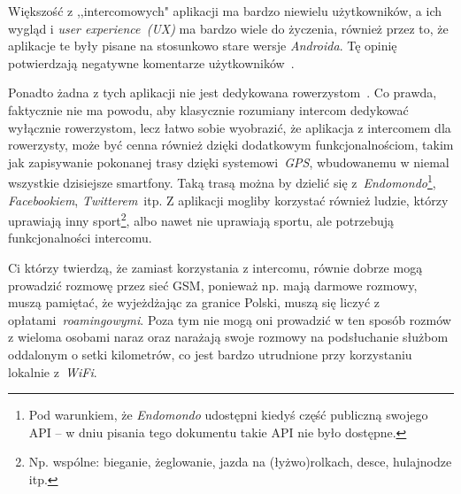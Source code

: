 \documentclass{article}
\begin{document}
Większość z ,,intercomowych" aplikacji ma bardzo niewielu użytkowników, a ich wygląd i \emph{user experience~(UX)} ma bardzo wiele do życzenia, również przez to, że aplikacje te były pisane na stosunkowo stare wersje \emph{Androida}. Tę opinię potwierdzają negatywne komentarze użytkowników~\cite{www:existing-android-intercoms}.

Ponadto żadna z tych aplikacji nie jest dedykowana rowerzystom~\cite{www:best-existing-android-intercom}. Co prawda, faktycznie nie ma powodu, aby klasycznie rozumiany intercom dedykować wyłącznie rowerzystom, lecz łatwo sobie wyobrazić, że aplikacja z intercomem dla rowerzysty, może być cenna również dzięki dodatkowym funkcjonalnościom, takim jak zapisywanie pokonanej trasy dzięki systemowi~\emph{GPS}, wbudowanemu w niemal wszystkie dzisiejsze smartfony. Taką trasą można by dzielić się z~\emph{Endomondo}\footnote{Pod warunkiem, że \emph{Endomondo} udostępni kiedyś część publiczną swojego API -- w dniu pisania tego dokumentu takie API nie było dostępne.}, \emph{Facebookiem}, \emph{Twitterem}~itp. Z aplikacji mogliby korzystać również ludzie, którzy uprawiają inny sport\footnote{Np. wspólne: bieganie, żeglowanie, jazda na (łyżwo)rolkach, desce, hulajnodze itp.}, albo nawet nie uprawiają sportu, ale potrzebują funkcjonalności intercomu.

Ci którzy twierdzą, że zamiast korzystania z intercomu, równie dobrze mogą prowadzić rozmowę przez sieć GSM, ponieważ np. mają darmowe rozmowy, muszą pamiętać, że wyjeżdżając za granice Polski, muszą się liczyć z opłatami~\emph{roamingowymi}. Poza tym nie mogą oni prowadzić w ten sposób rozmów z wieloma osobami naraz oraz narażają swoje rozmowy na podsłuchanie służbom oddalonym o setki kilometrów, co jest bardzo utrudnione przy korzystaniu lokalnie z~\emph{WiFi}.


\def\UrlBreaks{\do\/\do-}
\renewcommand\refname{Linki}


\end{document}
